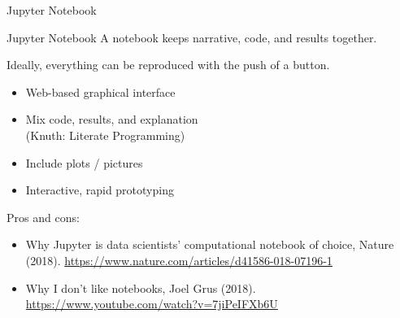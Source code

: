 \documentclass[aspectratio=169,usenames,dvipsnames]{beamer}
\begin{document}
\begin{frame}{Jupyter Notebook}
    \begin{block}{Jupyter Notebook}
        A notebook keeps narrative, code, and results together.

        Ideally, everything can be reproduced with the push of a button.
    \end{block}
    \begin{itemize}
        \item Web-based graphical interface
        \item Mix code, results, and explanation \\
                (Knuth: Literate Programming)
        \item Include plots / pictures
        \item Interactive, rapid prototyping
    \end{itemize}

    \pause
    Pros and cons:
    \begin{itemize}
        \item Why Jupyter is data scientists' computational notebook of choice,
            Nature (2018). \url{https://www.nature.com/articles/d41586-018-07196-1}
        \item Why I don't like notebooks, Joel Grus (2018).
            \url{https://www.youtube.com/watch?v=7jiPeIFXb6U}
    \end{itemize}
\end{frame}
\end{document}
